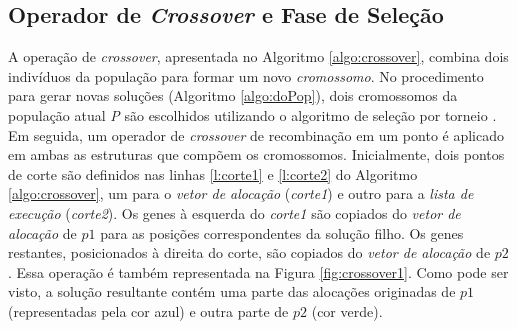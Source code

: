 \subsection{Operador de \textit{Crossover} e Fase de Seleção} \label{ssec:crossover}

A operação de \textit{crossover}, apresentada no Algoritmo \ref{algo:crossover}, combina dois indivíduos da população para formar um novo \textit{cromossomo}. No procedimento para gerar novas soluções (Algoritmo \ref{algo:doPop}), dois cromossomos da população atual \textit{P} são escolhidos utilizando o algoritmo de seleção por torneio \cite{Miller}. Em seguida, um operador de \textit{crossover} de recombinação em um ponto \cite{Holland1992} é aplicado em ambas as estruturas que compõem os cromossomos. Inicialmente, dois pontos de corte são definidos nas linhas \ref{l:corte1} e \ref{l:corte2} do Algoritmo \ref{algo:crossover}, um para o \textit{vetor de alocação} (\textit{corte1}) e outro para a \textit{lista de execução} (\textit{corte2}). Os genes à esquerda do \textit{corte1} são copiados do \textit{vetor de alocação} de $p1$ para as posições correspondentes da solução filho. Os genes restantes, posicionados à direita do corte, são copiados do \textit{vetor de alocação} de $p2$. Essa operação é também representada na Figura \ref{fig:crossover1}. Como pode ser visto, a solução resultante  contém uma parte das alocações originadas de $p1$ (representadas pela cor azul) e outra parte de $p2$ (cor verde). 

